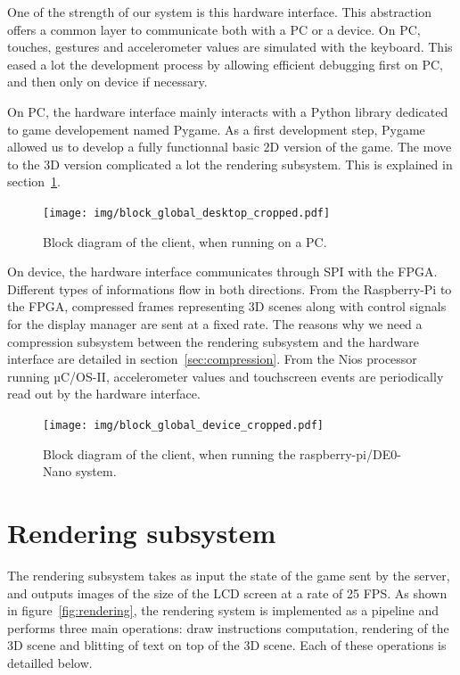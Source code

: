\documentclass[english, DIV=13]{scrreprt}
\begin{document}
One of the strength of our system is this hardware interface. This abstraction offers
a common layer to communicate both with a PC or a device.
On PC, touches, gestures and accelerometer values are simulated with the keyboard.
This eased a lot the development process by allowing efficient debugging first on PC,
and then only on device if necessary.

On PC, the hardware interface mainly interacts with a Python library dedicated to game
developement named Pygame. As a first development step, Pygame allowed us to develop
a fully functionnal basic 2D version of the game. The move to the 3D version
complicated a lot the rendering subsystem. This is explained in
section~\ref{sec:rendering}.

\begin{figure}[bth]
    \centering
    \texttt{[image: img/block\_global\_desktop\_cropped.pdf]}
    \caption{Block diagram of the client, when running on a PC.}
    \label{fig:global-desktop}
\end{figure}

On device, the hardware interface communicates through SPI with the FPGA.
Different types of informations flow in both directions. From the Raspberry-Pi to the
FPGA, compressed frames representing 3D scenes along with control signals for the
display manager are sent at a fixed rate. The reasons why we need a compression
subsystem between the rendering subsystem and the hardware interface are detailed in
section~\ref{sec:compression}. From the Nios processor running µC/OS-II, accelerometer
values and touchscreen events are periodically read out by the hardware interface.

\begin{figure}[bth]
    \centering
    \texttt{[image: img/block\_global\_device\_cropped.pdf]}
    \caption{Block diagram of the client, when running the raspberry-pi/DE0-Nano system.}
    \label{fig:global-device}
\end{figure}

\section{Rendering subsystem}
\label{sec:rendering}

The rendering subsystem takes as input the state of the game sent by the server,
and outputs images of the size of the LCD screen at a rate
of 25 FPS. As shown in figure~\ref{fig:rendering}, the rendering system is
implemented as a pipeline and performs three main operations: draw instructions
computation, rendering of the 3D scene and blitting of text on top of the 3D scene.
Each of these operations is detailled below.
\end{document}
